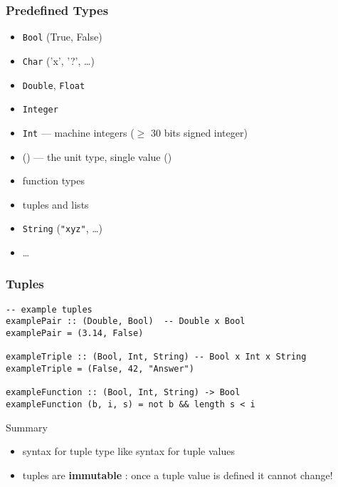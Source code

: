 \documentclass{beamer}
\subtitle{Types}
\begin{document}
\begin{frame}
  \titlepage
\end{frame}
\begin{frame}[fragile]
  \frametitle{Predefined Types}
  \begin{itemize}
  \item \texttt{Bool} (True, False)
  \item  \texttt{Char} ('x', '?', \dots)
  \item \texttt{Double}, \texttt{Float} 
  \item   \texttt{Integer}
  \item  \texttt{Int} --- machine integers ($\ge$ 30 bits signed
    integer)
  \item  ()
    --- the unit type, single value () 
  \item  function types
  \item tuples and lists
  \item \texttt{String} (\verb|"xyz"|, \dots)  
  \item \dots
  \end{itemize}
\end{frame}
\begin{frame}[fragile]
  \frametitle{Tuples}
  \begin{block}{}
\begin{verbatim}
-- example tuples
examplePair :: (Double, Bool)  -- Double x Bool
examplePair = (3.14, False)

exampleTriple :: (Bool, Int, String) -- Bool x Int x String
exampleTriple = (False, 42, "Answer")

exampleFunction :: (Bool, Int, String) -> Bool
exampleFunction (b, i, s) = not b && length s < i
\end{verbatim}
  \end{block}
  \begin{alertblock}{Summary}
    \begin{itemize}
    \item syntax for tuple type like syntax for tuple values
    \item tuples are \textbf{immutable} : once a tuple value is defined it cannot change!
    \end{itemize}
  \end{alertblock}
\end{frame}
\end{document}
